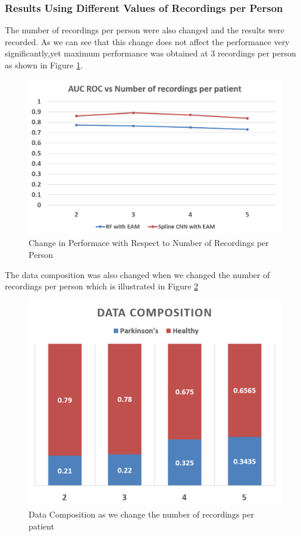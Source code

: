 \subsubsection{Results Using Different Values of Recordings per Person}
The number of recordings per person were also changed and the results were recorded. As we can see that this change does not affect the performance very significantly,yet maximum performance was obtained at 3 recordings per person as shown in Figure \ref{fig:fourth_rse}.
\begin{figure}[htbp]
  \centering
  \includegraphics[width=\textwidth]{./Figures/fourth_rse.png}
  \caption{Change in Performace with Respect to Number of Recordings per Person}
  \label{fig:fourth_rse}
\end{figure}
The data composition was also changed when we changed the number of recordings per person which is illustrated in Figure \ref{fig:fifth_res}
\begin{figure}[htbp]
  \centering
  \includegraphics[width=\textwidth]{./Figures/fifth_res.png}
  \caption{Data Composition as we change the number of recordings per patient}
  \label{fig:fifth_res}
\end{figure}
